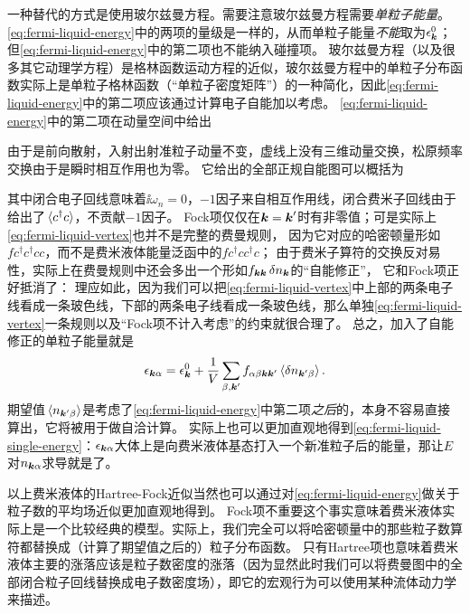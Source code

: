 一种替代的方式是使用玻尔兹曼方程。需要注意玻尔兹曼方程需要\emph{单粒子能量}。\eqref{eq:fermi-liquid-energy}中的两项的量级是一样的，从而单粒子能量\emph{不能}取为$\epsilon_{\vb*{k}}^0$；但\eqref{eq:fermi-liquid-energy}中的第二项也不能纳入碰撞项。
玻尔兹曼方程（以及很多其它动理学方程）是格林函数运动方程的近似，玻尔兹曼方程中的单粒子分布函数实际上是单粒子格林函数（“单粒子密度矩阵”）的一种简化，因此\eqref{eq:fermi-liquid-energy}中的第二项应该通过计算电子自能加以考虑。
\eqref{eq:fermi-liquid-energy}中的第二项在动量空间中给出

由于是前向散射，入射出射准粒子动量不变，虚线上没有三维动量交换，松原频率交换由于是瞬时相互作用也为零。
它给出的全部正规自能图可以概括为

其中闭合电子回线意味着$\ii \omega_n = 0$，$-1$因子来自相互作用线，闭合费米子回线由于给出了$\expval*{c^\dagger c}$，不贡献$-1$因子。
Fock项仅仅在$\vb*{k} = \vb*{k}'$时有非零值；可是实际上\eqref{eq:fermi-liquid-vertex}也并不是完整的费曼规则，
因为它对应的哈密顿量形如$f c^\dagger c^\dagger c c$，而不是费米液体能量泛函中的$f c^\dagger c c^\dagger c$；
由于费米子算符的交换反对易性，实际上在费曼规则中还会多出一个形如$f_{\vb*{k} \vb*{k}} \var{n}_{\vb*{k}}$的“自能修正”，
它和Fock项正好抵消了：
理应如此，因为我们可以把\eqref{eq:fermi-liquid-vertex}中上部的两条电子线看成一条玻色线，下部的两条电子线看成一条玻色线，那么单独\eqref{eq:fermi-liquid-vertex}一条规则以及“Fock项不计入考虑”的约束就很合理了。
总之，加入了自能修正的单粒子能量就是
\begin{equation}
    \epsilon_{\vb*{k} \alpha} = \epsilon_{\vb*{k}}^0 + \frac{1}{V} \sum_{\beta, \vb*{k}'} f_{\alpha \beta \vb*{k} \vb*{k}'} \expval*{\var{n_{\vb*{k}' \beta}}}.
    \label{eq:fermi-liquid-single-energy}
\end{equation}
期望值$\expval*{n_{\vb*{k}' \beta}}$是考虑了\eqref{eq:fermi-liquid-energy}中第二项\emph{之后}的，本身不容易直接算出，它将被用于做自洽计算。
实际上也可以更加直观地得到\eqref{eq:fermi-liquid-single-energy}：$\epsilon_{\vb*{k} \alpha}$大体上是向费米液体基态打入一个新准粒子后的能量，那让$E$对$n_{\vb*{k} \alpha}$求导就是了。

以上费米液体的Hartree-Fock近似当然也可以通过对\eqref{eq:fermi-liquid-energy}做关于粒子数的平均场近似更加直观地得到。
Fock项不重要这个事实意味着费米液体实际上是一个比较经典的模型。实际上，我们完全可以将哈密顿量中的那些粒子数算符都替换成（计算了期望值之后的）粒子分布函数。
只有Hartree项也意味着费米液体主要的涨落应该是粒子数密度的涨落（因为显然此时我们可以将费曼图中的全部闭合粒子回线替换成电子数密度场），即它的宏观行为可以使用某种流体动力学来描述。

